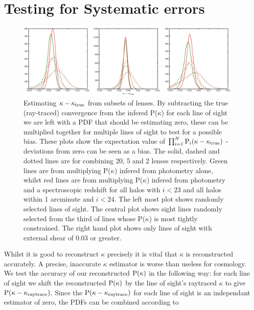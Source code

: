 \documentclass[useAMS,usenatbib]{mn2e}
\begin{document}


\section{Testing for Systematic errors}
\label{sec:biases}
\begin{figure}
\includegraphics[width=\textwidth]{figs/biasplots.eps}
\caption[magcut]{Estimating $\kappa-\kappa_{\rm true}$ from subsets of lenses. By subtracting the true (ray-traced) convergence from the infered P($\kappa$) for each line of sight we are left with a PDF that should be estimating zero, these can be multiplied together for multiple lines of sight to test for a possible bias. These plots show the expectation value of $\prod_{i=1}^N {\rm P}_i(\kappa-\kappa_{\rm true})$ - deviations from zero can be seen as a bias. The solid, dashed and dotted lines are for combining 20, 5 and 2 lenses respectively. Green lines are from multiplying P($\kappa$) infered from photometry alone, whilst red lines are from multiplying P($\kappa$) infered from photometry and a spectroscopic redshift for all halos with $i<23$ and all halos within 1 arcminute and $i<24$. The left most plot shows randomly selected lines of sight. The central plot shows sight lines randomly selected from the third of lines whose P($\kappa$) is most tightly constrained. The right hand plot shows only lines of sight with external shear of 0.03 or greater.}
\label{fig:where}
\end{figure}

Whilst it is good to reconstruct $\kappa$ precisely it is vital that $\kappa$ is reconstructed accurately. A precise, inaccurate $\kappa$ estimator is worse than useless for cosmology. We test the accuracy of our reconstructed ${\rm P}(\kappa)$ in the following way: for each line of sight we shift the reconstructed ${\rm P}(\kappa)$ by the line of sight's raytraced $\kappa$ to give ${\rm P}(\kappa-\kappa_{\rm raytrace})$. Since the ${\rm P}(\kappa-\kappa_{\rm raytrace})$ for each line of sight is an independant estimator of zero, the PDFs can be combined according to
\end{document}
